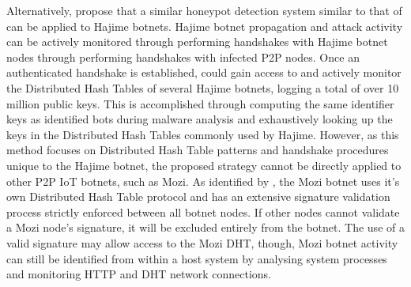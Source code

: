 Alternatively, \citet{Herwig2019} propose that a similar honeypot detection system similar to that of \citep{Bastos2019, Ceron2019} can be applied to Hajime botnets. Hajime botnet propagation and attack activity can be actively monitored through performing handshakes with Hajime botnet nodes through performing handshakes with infected P2P nodes. Once an authenticated handshake is established, \citet{Herwig2019} could gain access to and actively monitor the Distributed Hash Tables of several Hajime botnets, logging a total of over 10 million public keys. This is accomplished through computing the same identifier keys as identified bots during malware analysis and exhaustively looking up the keys in the Distributed Hash Tables commonly used by Hajime. However, as this method focuses on Distributed Hash Table patterns and handshake procedures unique to the Hajime botnet, the proposed strategy cannot be directly applied to other P2P IoT botnets, such as Mozi. As identified by \citet{Netlab2019}, the Mozi botnet uses it's own Distributed Hash Table protocol and has an extensive signature validation process strictly enforced between all botnet nodes. If other nodes cannot validate a Mozi node's signature, it will be excluded entirely from the botnet. The use of a valid signature may allow access to the Mozi DHT, though, Mozi botnet activity can still be identified from within a host system by analysing system processes and monitoring HTTP and DHT network connections. 